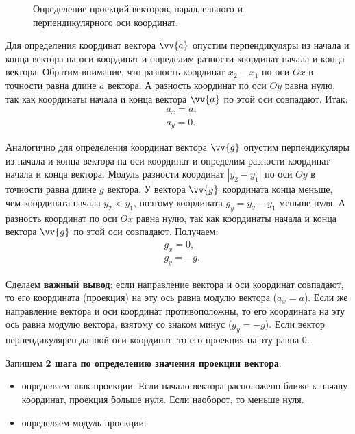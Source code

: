 \begin{figure}[h]
  \caption{\small Определение проекций векторов, параллельного и перпендикулярного
    оси координат.}\label{pic:vec_coord0}
\end{figure}

Для определения координат вектора $\vv{a}$ опустим перпендикуляры из начала и конца
вектора на оси координат и определим разности координат начала и конца вектора.
Обратим внимание, что разность координат $x_2-x_1$ по оси $Ox$ в точности
равна длине $a$ вектора. А разность координат по оси $Oy$ равна нулю, так как
координаты начала и конца вектора $\vv{a}$ по этой оси совпадают.
Итак:
\begin{align*}
  &a_x = a,\\
  &a_y = 0.
\end{align*}

Аналогично для определения координат вектора $\vv{g}$ опустим перпендикуляры из начала и конца
вектора на оси координат и определим разности координат начала и конца вектора.
Модуль разности координат $|y_2-y_1|$ по оси $Oy$ в точности
равна длине $g$ вектора. У вектора $\vv{g}$ координата конца меньше,
чем координата начала $y_2<y_1$, поэтому координата $g_y=y_2-y_1$ меньше нуля.
А разность координат по оси $Ox$ равна нулю, так как
координаты начала и конца вектора $\vv{g}$ по этой оси совпадают.
Получаем:
\begin{align*}
  &g_x  = 0,\\
  &g_y = -g.
\end{align*}

Сделаем \textbf{важный вывод}:
если направление вектора и оси координат совпадают, то его координата
(проекция) на эту ось равна модулю вектора ($a_x = a$).
Если же направление вектора и оси координат противоположны, то его координата
на эту ось равна модулю вектора, взятому со знаком минус ($g_y = -g$).
Если вектор перпендикулярен данной оси координат, то его проекция на эту равна 0.

Запишем \textbf{2 шага по определению значения проекции вектора}:
\begin{itemize}
\item определяем знак проекции. Если начало вектора расположено ближе к началу
  координат, проекция больше нуля. Если наоборот, то меньше нуля.
  \item определяем модуль проекции.
\end{itemize}

